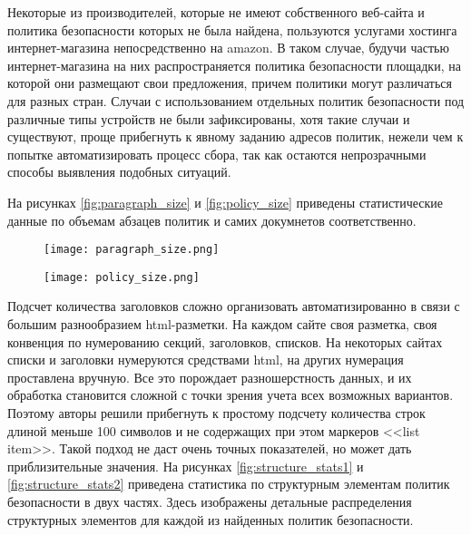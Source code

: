 \documentclass[../main]{subfiles}
\begin{document}
Некоторые из производителей, которые не имеют собственного веб-сайта и политика безопасности которых не была найдена, пользуются услугами хостинга интернет-магазина непосредственно на amazon. В таком случае, будучи частью интернет-магазина на них распространяется политика безопасности площадки, на которой они размещают свои предложения, причем политики могут различаться для разных стран. Случаи с использованием отдельных политик безопасности под различные типы устройств не были зафиксированы, хотя такие случаи и существуют, проще прибегнуть к явному заданию адресов политик, нежели чем к попытке автоматизировать процесс сбора, так как остаются непрозрачными способы выявления подобных ситуаций.

На рисунках \ref{fig:paragraph_size} и \ref{fig:policy_size} приведены статистические данные по объемам абзацев политик и самих докумнетов соответственно.

\begin{figure}[H]
    \centering
    {\texttt{[image: paragraph\_size.png]}}
    \vspace{-\baselineskip}
\end{figure}

\begin{figure}[H]
    \centering
    {\texttt{[image: policy\_size.png]}}
    \vspace{-\baselineskip}
\end{figure}

Подсчет количества заголовков сложно организовать автоматизированно в связи с большим разнообразием html-разметки. На каждом сайте своя разметка, своя конвенция по нумерованию секций, заголовков, списков. На некоторых сайтах списки и заголовки нумеруются средствами html, на других нумерация проставлена вручную. Все это порождает разношерстность данных, и их обработка становится сложной с точки зрения учета всех возможных вариантов. Поэтому авторы решили прибегнуть к простому подсчету количества строк длиной меньше 100 символов и не содержащих при этом маркеров <<{list item}>>. Такой подход не даст очень точных показателей, но может дать приблизительные значения. На рисунках \ref{fig:structure_stats1} и \ref{fig:structure_stats2} приведена статистика по структурным элементам политик безопасности в двух частях. Здесь изображены детальные распределения структурных элементов для каждой из найденных политик безопасности.
\end{document}
